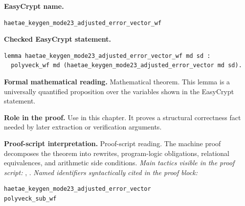 \begin{formaltheorem}
\noindent\textbf{EasyCrypt name.}
\begin{lstlisting}[language=EasyCrypt,basicstyle=\ttfamily\scriptsize]
haetae_keygen_mode23_adjusted_error_vector_wf
\end{lstlisting}
\noindent\textbf{Checked EasyCrypt statement.}
\begin{lstlisting}[language=EasyCrypt,basicstyle=\ttfamily\scriptsize]
lemma haetae_keygen_mode23_adjusted_error_vector_wf md sd :
  polyveck_wf md (haetae_keygen_mode23_adjusted_error_vector md sd).
\end{lstlisting}
\noindent\textbf{Formal mathematical reading.}
Mathematical theorem. This lemma is a universally quantified proposition over the variables shown in the EasyCrypt statement.

\noindent\textbf{Role in the proof.}
Use in this chapter. It proves a structural correctness fact needed by later extraction or verification arguments.

\noindent\textbf{Proof-script interpretation.}
Proof-script reading. The machine proof decomposes the theorem into rewrites, program-logic obligations, relational equivalences, and arithmetic side conditions.
\emph{Main tactics visible in the proof script:} , .
\emph{Named identifiers syntactically cited in the proof block:}
\begin{lstlisting}[language=EasyCrypt,basicstyle=\ttfamily\scriptsize]
haetae_keygen_mode23_adjusted_error_vector
polyveck_sub_wf
\end{lstlisting}

\end{formaltheorem}

